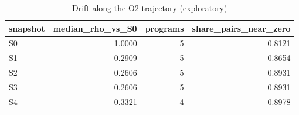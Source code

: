 \begin{table}[t]
\centering
\caption{Drift along the O2 trajectory (exploratory)}
\label{tab:v3-1-drift-decay}
\begin{tabular}{lrrr}
\toprule
snapshot & median\_rho\_vs\_S0 & programs & share\_pairs\_near\_zero \\
\midrule
S0 & 1.0000 & 5 & 0.8121 \\
S1 & 0.2909 & 5 & 0.8654 \\
S2 & 0.2606 & 5 & 0.8931 \\
S3 & 0.2606 & 5 & 0.8931 \\
S4 & 0.3321 & 4 & 0.8978 \\
\bottomrule
\end{tabular}
\end{table}
